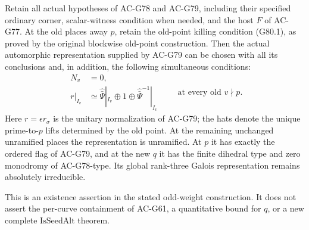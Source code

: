\begin{theorem}
\label{thm:G80}
Retain all actual hypotheses of AC-G78 and AC-G79, including their
specified ordinary corner, scalar-witness condition when needed,
and the host \(F\) of AC-G77.  At the old places away \(p\), retain the
old-point killing condition (G80.1), as proved by the original
blockwise old-point construction.
Then the actual automorphic representation supplied by AC-G79 can be
chosen with all its conclusions and, in addition, the following
simultaneous conditions:
\[
 \begin{split}
  N_v&=0,\\
  r|_{I_v}&\simeq
       \widehat{\bar\Psi}|_{I_v}\oplus 1\oplus
       \widehat{\bar\Psi}^{-1}|_{I_v}
 \end{split}
 \qquad\text{at every old }v\nmid p.               \tag{G80.9}
\]
Here \(r=\epsilon r_\sigma\) is the unitary normalization of AC-G79;
the hats denote the unique prime-to-\(p\) lifts determined by the old
point.  At the remaining unchanged unramified places the representation
is unramified.  At \(p\) it has exactly the ordered flag of AC-G79,
and at the new \(q\) it has the finite dihedral type and zero monodromy
of AC-G78-type.  Its global rank-three Galois representation remains
absolutely irreducible.

This is an existence assertion in the stated odd-weight construction.
It does not assert the per-curve containment of AC-G61, a quantitative
bound for \(q\), or a new complete \(\mathrm{IsSeedAlt}\) theorem.
\end{theorem}

